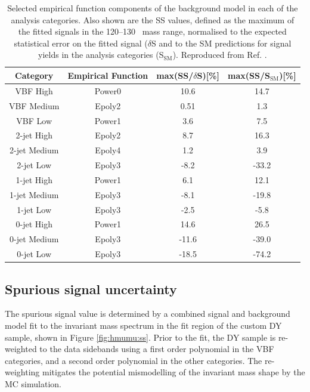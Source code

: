 \begin{table}[htb]
  \centering
  \caption{
    Selected empirical function components of the background model
    in each of the analysis categories. Also shown are the SS values,
    defined as the maximum of the fitted signals in the 120--130
    \GeV~mass range, normalised to the expected statistical error
    on the fitted signal ($\delta$S and to the SM predictions
    for signal yields in the analysis categories (S$_\text{SM}$).
    Reproduced from Ref. \cite{ATLAS-CONF-2019-028}.}
  \label{tab:hmumu:ss}
  \begin{tabular}{cccc}
    \toprule
    Category & Empirical Function & max(SS/$\delta$S)[\%] & max(SS/S$_\text{SM}$)[\%] \\
    \midrule
    VBF High & Power0 & 10.6 & 14.7 \\
    VBF Medium & Epoly2 & 0.51 & 1.3 \\
    VBF Low & Power1 & 3.6 & 7.5 \\
    2-jet High & Epoly2 & 8.7 & 16.3 \\
    2-jet Medium & Epoly4 & 1.2 & 3.9 \\
    2-jet Low & Epoly3 & -8.2 & -33.2 \\
    1-jet High & Power1 & 6.1 & 12.1 \\
    1-jet Medium & Epoly3 & -8.1 & -19.8 \\
    1-jet Low & Epoly3 & -2.5 & -5.8 \\
    0-jet High & Power1 & 14.6 & 26.5 \\
    0-jet Medium & Epoly3 & -11.6 & -39.0 \\
    0-jet Low & Epoly3 & -18.5 & -74.2 \\
    \bottomrule
  \end{tabular}
\end{table}

\subsection{Spurious signal uncertainty}
\label{sec:hmumu:sstest}

The spurious signal value is determined by a combined signal
and background model fit to the invariant mass spectrum
in the fit region of the custom DY sample, shown in Figure
\ref{fig:hmumu:ss}. Prior to the fit,
the DY sample is re-weighted to the data sidebands using a first
order polynomial in the VBF categories, and a second order
polynomial in the other categories. The re-weighting mitigates
the potential mismodelling of the invariant mass shape by the
MC simulation.

